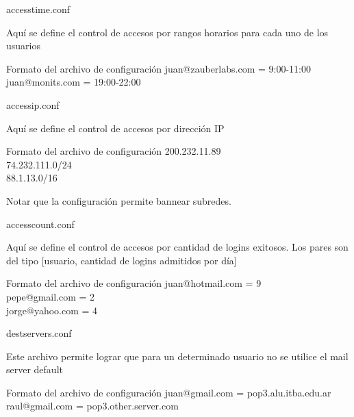 \documentclass{beamer}
\begin{document}
\begin{frame}{access\textunderscore time.conf}

\par Aquí se define el control de accesos por rangos horarios para cada uno de los usuarios\\[0.5cm]

\begin{block}{Formato del archivo de configuración}
juan@zauberlabs.com = 9:00-11:00\\
juan@monits.com = 19:00-22:00\\
\end{block}

\end{frame}

\begin{frame}{access\textunderscore ip.conf}

\par Aquí se define el control de accesos por dirección IP \\[0.5cm]

\begin{block}{Formato del archivo de configuración}
200.232.11.89\\
74.232.111.0/24\\
88.1.13.0/16\\
\end{block}

\par Notar que la configuración permite bannear subredes.

\end{frame}

\begin{frame}{access\textunderscore count.conf}

\par Aquí se define el control de accesos por cantidad de logins exitosos. Los pares son del tipo [usuario, cantidad de logins admitidos por día]\\[0.5cm]

\begin{block}{Formato del archivo de configuración}
juan@hotmail.com = 9\\
pepe@gmail.com = 2\\
jorge@yahoo.com = 4\\
\end{block}

\end{frame}

\begin{frame}{dest\textunderscore servers.conf}

\par Este archivo permite lograr que para un determinado usuario no se utilice el mail server default\\[0.5cm]

\begin{block}{Formato del archivo de configuración}
juan@gmail.com = pop3.alu.itba.edu.ar\\
raul@gmail.com = pop3.other.server.com\\
\end{block}

\end{frame}
\end{document}
